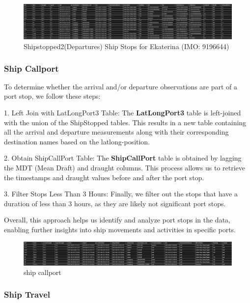 \begin{figure}[h]
    \centering
    \includegraphics[width=1\textwidth]{images/ship_stop2.png}
    \caption{Shipstopped2(Departures) Ship Stops for Ekaterina (IMO: 9196644)}
    \label{ship_stop2}
\end{figure}

\subsubsection{Ship Callport}

To determine whether the arrival and/or departure observations are part of a port stop, we follow these steps:

1. Left Join with LatLongPort3 Table:
The \textbf{LatLongPort3} table is left-joined with the union of the ShipStopped tables.
This results in a new table containing all the arrival and departure measurements along with their corresponding destination names based on the latlong-position.

2. Obtain ShipCallPort Table:
The \textbf{ShipCallPort} table is obtained by lagging the MDT (Mean Draft) and draught columns.
This process allows us to retrieve the timestamps and draught values before and after the port stop.

3. Filter Stops Less Than 3 Hours:
Finally, we filter out the stops that have a duration of less than 3 hours, as they are likely not significant port stops.

Overall, this approach helps us identify and analyze port stops in the data, enabling further insights into ship movements and activities in specific ports.

\begin{figure}[h]
    \centering
    \includegraphics[width=1\textwidth]{images/ship_callport.png}
    \caption{ship callport}
    \label{ship_callport}
\end{figure}

\subsubsection{Ship Travel}

